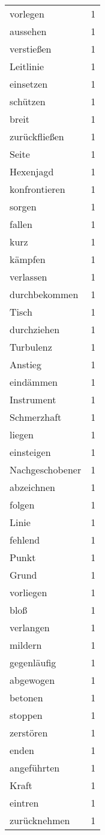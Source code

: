 \begin{tabular}{lr}
vorlegen & 1 \\
aussehen & 1 \\
verstießen & 1 \\
Leitlinie & 1 \\
einsetzen & 1 \\
schützen & 1 \\
breit & 1 \\
zurückfließen & 1 \\
Seite & 1 \\
Hexenjagd & 1 \\
konfrontieren & 1 \\
sorgen & 1 \\
fallen & 1 \\
kurz & 1 \\
kämpfen & 1 \\
verlassen & 1 \\
durchbekommen & 1 \\
Tisch & 1 \\
durchziehen & 1 \\
Turbulenz & 1 \\
Anstieg & 1 \\
eindämmen & 1 \\
Instrument & 1 \\
Schmerzhaft & 1 \\
liegen & 1 \\
einsteigen & 1 \\
Nachgeschobener & 1 \\
abzeichnen & 1 \\
folgen & 1 \\
Linie & 1 \\
fehlend & 1 \\
Punkt & 1 \\
Grund & 1 \\
vorliegen & 1 \\
bloß & 1 \\
verlangen & 1 \\
mildern & 1 \\
gegenläufig & 1 \\
abgewogen & 1 \\
betonen & 1 \\
stoppen & 1 \\
zerstören & 1 \\
enden & 1 \\
angeführten & 1 \\
Kraft & 1 \\
eintren & 1 \\
zurücknehmen & 1 \\

\end{tabular}
